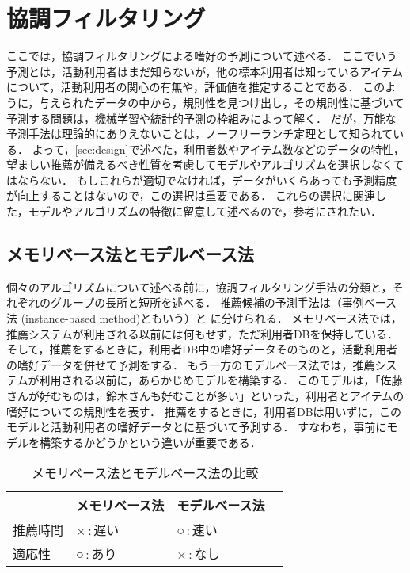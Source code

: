 \chapter{協調フィルタリング}
\label{sec:prediction}

ここでは，協調フィルタリングによる嗜好の予測について述べる．
ここでいう予測とは，活動利用者はまだ知らないが，他の標本利用者は知っているアイテムについて，活動利用者の関心の有無や，評価値を推定することである．
このように，与えられたデータの中から，規則性を見つけ出し，その規則性に基づいて予測する問題は，機械学習や統計的予測の枠組みによって解く．
だが，万能な予測手法は理論的にありえないことは，ノーフリーランチ定理として知られている．
よって，\ref{sec:design}で述べた，利用者数やアイテム数などのデータの特性，望ましい推薦が備えるべき性質を考慮してモデルやアルゴリズムを選択しなくてはならない．
もしこれらが適切でなければ，データがいくらあっても予測精度が向上することはないので，この選択は重要である．
これらの選択に関連した，モデルやアルゴリズムの特徴に留意して述べるので，参考にされたい．

\section{メモリベース法とモデルベース法}
\label{sec:memory-model}


個々のアルゴリズムについて述べる前に，協調フィルタリング手法の分類と，それぞれのグループの長所と短所を述べる．
推薦候補の予測手法は（事例ベース法 (instance-based method)ともいう）と
 に分けられる\cite{uai:98:01}．
メモリベース法では，推薦システムが利用される以前には何もせず，ただ利用者DBを保持している．
そして，推薦をするときに，利用者DB中の嗜好データそのものと，活動利用者の嗜好データを併せて予測をする．
もう一方のモデルベース法では，推薦システムが利用される以前に，あらかじめモデルを構築する．
このモデルは，「佐藤さんが好むものは，鈴木さんも好むことが多い」といった，利用者とアイテムの嗜好についての規則性を表す．
推薦をするときに，利用者DBは用いずに，このモデルと活動利用者の嗜好データとに基づいて予測する．
すなわち，事前にモデルを構築するかどうかという違いが重要である．

\begin{table}
\centering
\caption{メモリベース法とモデルベース法の比較}
\label{tab:memory-model}
\begin{tabular}{l@{\qquad}>{\centering}p{}>{\centering}p{}p{0pt}}\toprule
 & メモリベース法 & モデルベース法 & \\\midrule
推薦時間 & ×\,:\,遅い & ○\,:\,速い & \\
適応性   & ○\,:\,あり & ×\,:\,なし & \\
\bottomrule
\end{tabular}
\end{table}

